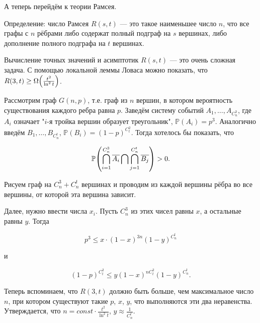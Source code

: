 \documentclass[12pt]{article}
\DeclarePairedDelimiter\autobracket{(}{)}
\newcommand{\br}[1]{\autobracket*{#1}}
\renewcommand{\P}{\mathbb{P}}
\begin{document}
\blacksquare

А теперь перейдём к теории Рамсея.

Определение: число Рамсея $R(s, t)$ — это такое наименьшее число $n$, что все графы с $n$ рёбрами либо содержат полный подграф на $s$ вершинах, либо дополнение полного подграфа на $t$ вершинах.

Вычисление точных значений и асимптотик $R(s, t)$ — это очень сложная задача. С помощью локальной леммы Ловаса можно показать, что $R(3, t) \geq \Omega \br{\frac {t^2} {\ln^2 t}}$.

Рассмотрим граф $G(n, p)$, т.е. граф из $n$ вершин, в котором вероятность существования каждого ребра равна $p$. Заведём систему событий $A_1, \ldots, A_{C^3_n}$, где $A_i$ означает "$i$-я тройка вершин образует треугольник", $\P(A_i) = p^3$. Аналогично введём $B_1, \ldots, B_{C^t_n}$, $\P(B_i) = (1 - p)^{C^2_t}$. Тогда хотелось бы показать, что

\[
\P \br{\bigcap_{i=1}^{C^3_n} \overline{A_i} \bigcap \bigcap_{j=1}^{C^t_n} \overline{B_j}} > 0.
\]

Рисуем граф на $C^3_n + C^t_n$ вершинах и проводим из каждой вершины рёбра во все вершины, от которой эта вершина зависит.

Далее, нужно ввести числа $x_i$. Пусть $C^3_n$ из этих чисел равны $x$, а остальные равны $y$. Тогда

\[
p^3 \leq x \cdot (1 - x)^{3n} (1 - y)^{C^t_n}
\]

и

\[
(1 - p)^{C^2_t} \leq y (1 - x)^{n C^2_t} (1 - y)^{C^t_n}.
\]

Теперь вспоминаем, что $R(3, t)$ должно быть больше, чем максимальное число $n$, при котором существуют такие $p$, $x$, $y$, что выполняются эти два неравенства. Утверждается, что $n = const \cdot \frac {t^2} {\ln^2 t}$, $y \approx \frac 1 {C^t_n}$.
\end{document}
